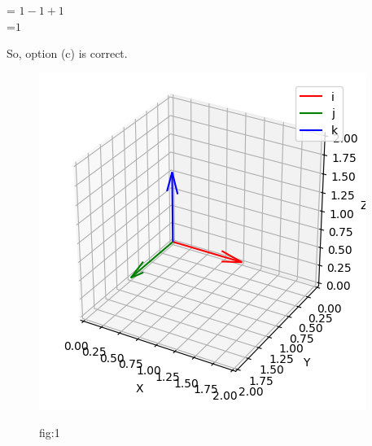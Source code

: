 \documentclass[12pt]{article}
\begin{document}
\begin{center}
    = $ 1 - 1 + 1 $\\
    =$1$\\
\end{center}
So, option (c) is correct.

\begin{figure}[H]
	       \centering
		\includegraphics[width=\columnwidth]{figs/unit_vec.png}
                \label{fig:12/10/5/18}
	        \caption{fig:1}
               \end{figure}
\end{document}

